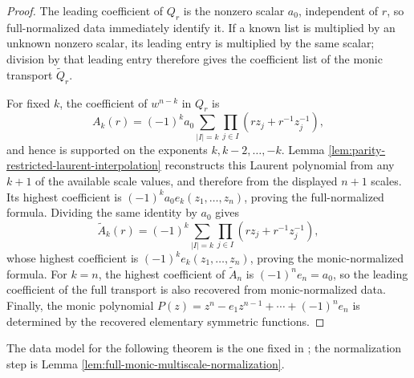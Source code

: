 \begin{proof}
The leading coefficient of \(Q_r\) is the nonzero scalar \(a_0\), independent of \(r\), so full-normalized data immediately identify it.  If a known list is multiplied by an unknown nonzero scalar, its leading entry is multiplied by the same scalar; division by that leading entry therefore gives the coefficient list of the monic transport \(\widetilde Q_r\).

For fixed \(k\), the coefficient of \(w^{n-k}\) in \(Q_r\) is
\[
A_k(r)=(-1)^k a_0\sum_{|I|=k}\prod_{j\in I}(rz_j+r^{-1}z_j^{-1}),
\]
and hence is supported on the exponents \(k,k-2,
\dots,-k\).  Lemma \ref{lem:parity-restricted-laurent-interpolation} reconstructs this Laurent polynomial from any \(k+1\) of the available scale values, and therefore from the displayed \(n+1\) scales.  Its highest coefficient is \((-1)^ka_0e_k(z_1,
\dots,z_n)\), proving the full-normalized formula.  Dividing the same identity by \(a_0\) gives
\[
\widetilde A_k(r)=(-1)^k\sum_{|I|=k}\prod_{j\in I}(rz_j+r^{-1}z_j^{-1}),
\]
whose highest coefficient is \((-1)^ke_k(z_1,
\dots,z_n)\), proving the monic-normalized formula.  For \(k=n\), the highest coefficient of \(\widetilde A_n\) is \((-1)^ne_n=a_0\), so the leading coefficient of the full transport is also recovered from monic-normalized data.  Finally, the monic polynomial \(P(z)=z^n-e_1z^{n-1}+\cdots+(-1)^ne_n\) is determined by the recovered elementary symmetric functions.
\end{proof}

The data model for the following theorem is the one fixed in
; the normalization step is Lemma
\ref{lem:full-monic-multiscale-normalization}.

